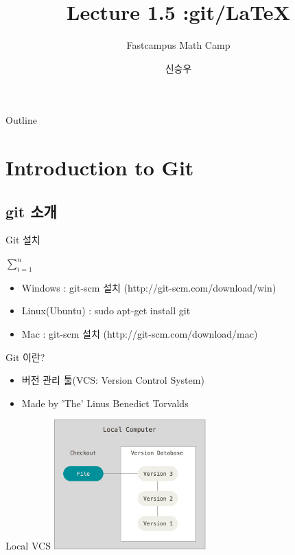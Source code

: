 \documentclass{beamer}
\title{Lecture 1.5 :git/LaTeX}
\subtitle{Fastcampus Math Camp}
\author{신승우}
\begin{document}
\begin{frame}
  \titlepage
\end{frame}

\begin{frame}{Outline}
  \tableofcontents[hideallsubsections]
\end{frame}


\section{Introduction to Git} 

\subsection{git 소개} 

\begin{frame}{Git 설치}

$\sum^{n}_{i=1}$
\begin{itemize} 
\item Windows : git-scm 설치 (http://git-scm.com/download/win)
\item Linux(Ubuntu) : sudo apt-get install git
\item Mac : git-scm 설치 (http://git-scm.com/download/mac)
\end{itemize}
\end{frame}

\begin{frame}{Git 이란?}
\begin{itemize}
\item 버전 관리 툴(VCS: Version Control System)
\item Made by 'The' Linus Benedict Torvalds
\end{itemize}
\end{frame}

\begin{frame}{Local VCS}
\includegraphics[height=5cm,keepaspectratio]{local}
\end{frame}
\end{document}
